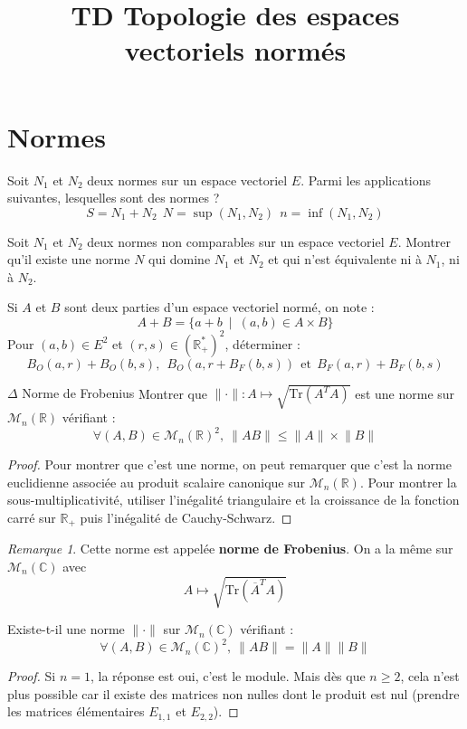 \documentclass[french,a4paper]{article}
\title{TD Topologie des espaces vectoriels normés}
\newcommand{\R}{\mathbb{R}}
\newcommand{\C}{\mathbb{C}}
\newcommand{\st}{^*}
\newcommand{\Tr}{\text{Tr}}
\theoremstyle{plain}
\theoremstyle{definition}
\theoremstyle{remark}
\newtheorem*{rmq}{Remarque}
\begin{document}
\maketitle

\section{Normes}

\begin{ex}{}
	Soit $N_1$ et $N_2$ deux normes sur un espace vectoriel $E$. Parmi les applications suivantes, lesquelles sont des normes ? $$S=N_1+N_2\ \ N=\sup(N_1,N_2)\ \ n=\inf(N_1,N_2)$$
\end{ex}

\begin{ex}{}
	Soit $N_1$ et $N_2$ deux normes non comparables sur un espace vectoriel $E$. Montrer qu'il existe une norme $N$ qui domine $N_1$ et $N_2$ et qui n'est équivalente ni à $N_1$, ni à $N_2$.
\end{ex}

\begin{ex}{}
	Si $A$ et $B$ sont deux parties d'un espace vectoriel normé, on note : $$A+B=\{a+b\ \mid\ (a,b)\in A\times B\}$$ Pour $(a,b)\in E^2$ et $(r,s)\in\left(\R_+\st\right)^2$, déterminer : $$B_O(a,r)+B_O(b,s),\ \ B_O(a,r+B_F(b,s))\ \ \text{et}\ \ B_F(a,r)+B_F(b,s)$$
\end{ex}

\begin{ex}{$\Delta$ Norme de Frobenius}
	Montrer que $\lVert \cdot\rVert :A\mapsto\sqrt{\Tr(A^TA)}$ est une norme sur $\mathcal{M}_n(\R)$ vérifiant : $$\forall (A,B)\in\mathcal{M}_n(\R)^2,\ \lVert AB\rVert\leqslant\lVert A\rVert \times\lVert B\rVert$$
\end{ex}
\begin{proof}
	Pour montrer que c'est une norme, on peut remarquer que c'est la norme euclidienne associée au produit scalaire canonique sur $\mathcal{M}_n(\R)$. Pour montrer la sous-multiplicativité, utiliser l'inégalité triangulaire et la croissance de la fonction carré sur $\R_+$ puis l'inégalité de Cauchy-Schwarz.
\end{proof}
\begin{rmq}
	Cette norme est appelée \textbf{norme de Frobenius}. On a la même sur $\mathcal{M}_n(\C)$ avec $$A\mapsto\sqrt{\Tr\left(\overline{A}^T A\right)}$$
\end{rmq}

\begin{ex}{}
	Existe-t-il une norme $\lVert\cdot\rVert$ sur $\mathcal{M}_n(\C)$ vérifiant : $$\forall(A,B)\in\mathcal{M}_n(\C)^2,\ \lVert AB\rVert=\lVert A\rVert\lVert B\rVert$$
\end{ex}
\begin{proof}
	Si $n=1$, la réponse est oui, c'est le module. Mais dès que $n\geqslant 2$, cela n'est plus possible car il existe des matrices non nulles dont le produit est nul (prendre les matrices élémentaires $E_{1,1}$ et $E_{2,2}$).
\end{proof}
\end{document}
